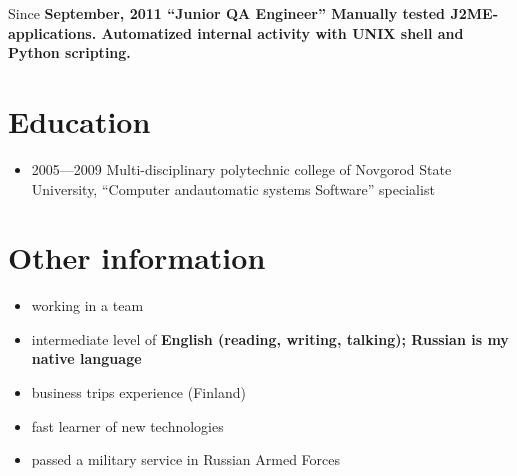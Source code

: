 \vspace{15pt}
\subitem Since \bfseries September, 2011 \mdseries ``Junior QA Engineer''
\subitem Manually tested J2ME-applications.
\subitem Automatized internal activity with
\bfseries UNIX shell \mdseries and \bfseries Python \mdseries scripting.

\section{Education}
\begin{itemize}
\item 2005---2009 Multi-disciplinary polytechnic college of
Novgorod State University,
``Computer and\linebreak automatic systems Software'' specialist
\end{itemize}

\section{Other information}
\begin{itemize}
\item working in a team
\item intermediate level of \bfseries English \mdseries (reading, writing, talking);
Russian is my native language
\item business trips experience (Finland)
\item fast learner of new technologies
\item passed a military service in Russian Armed Forces
\end{itemize}

